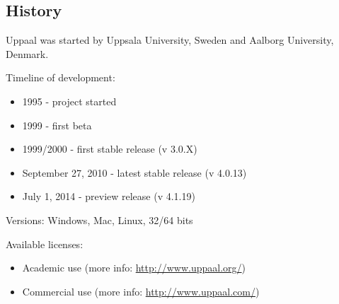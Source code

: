 \documentclass{beamer}
\begin{document}
\subsection{History}
\begin{frame}
	Uppaal was started by Uppsala University, Sweden and Aalborg University, Denmark.
	
	Timeline of development:
	\begin{itemize}
		\item 1995 - project started
		\item 1999 - first beta
		\item 1999/2000 - first stable release (v 3.0.X)
		\item September 27, 2010 - latest stable release (v 4.0.13)
		\item July 1, 2014 - preview release (v 4.1.19)
	\end{itemize}
	
	Versions: Windows, Mac, Linux, 32/64 bits
	
	Available licenses:
	\begin{itemize}
		\item Academic use (more info: \href{http://www.uppaal.org/}{http://www.uppaal.org/})
		\item Commercial use (more info: \href{http://www.uppaal.com/}{http://www.uppaal.com/})
	\end{itemize}
\end{frame}


\end{document}
